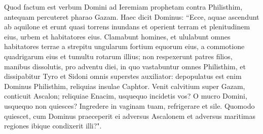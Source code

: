 \begin{biblechapter}  
\verse Quod factum est verbum Domini ad Ieremiam prophetam contra Philisthim, antequam percuteret pharao Gazam. 
\verse Haec dicit Dominus: “Ecce, aquae ascendunt ab aquilone et erunt quasi torrens inundans et operient terram et plenitudinem eius, urbem et habitatores eius. Clamabunt homines, et ululabunt omnes habitatores terrae 
\verse a strepitu ungularum fortium equorum eius, a commotione quadrigarum eius et tumultu rotarum illius; non respexerunt patres filios, manibus dissolutis, 
\verse pro adventu diei, in quo vastabuntur omnes Philisthim, et dissipabitur Tyro et Sidoni omnis superstes auxiliator: depopulatus est enim Dominus Philisthim, reliquias insulae Caphtor. 
\verse Venit calvitium super Gazam, conticuit Ascalon; reliquiae Enacim, usquequo incidetis vos? 
\verse O mucro Domini, usquequo non quiesces? Ingredere in vaginam tuam, refrigerare et sile. 
\verse Quomodo quiescet, cum Dominus praeceperit ei adversus Ascalonem et adversus maritimas regiones ibique condixerit illi?". 
\end{biblechapter}

